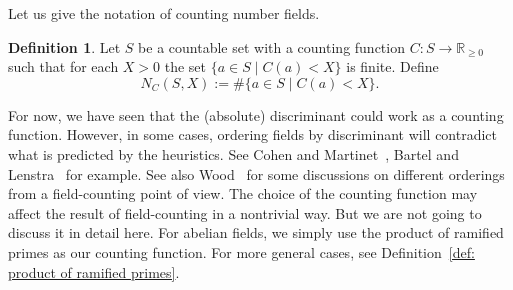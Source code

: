 \documentclass{amsart}
\numberwithin{equation}{section}
\theoremstyle{plain}
\theoremstyle{definition}
\newtheorem{definition}[theorem]{Definition}
\theoremstyle{remark}
\begin{document}
Let us give the notation of counting number fields.
\begin{definition}\label{def:counting number fields}
    Let $S$ be a countable set with a counting function $C:S\to\mathbb{R}_{\geq0}$ such that for each $X>0$ the set $\{a\in S\mid C(a)<X\}$ is finite.
    Define
	\begin{equation*}
		N_{C}(S,X):=\#\{a\in S\mid C(a)<X\}.
	\end{equation*}
\end{definition}
For now, we have seen that the (absolute) discriminant could work as a counting function.
However, in some cases, ordering fields by discriminant will contradict what is predicted by the heuristics.
See Cohen and Martinet~\cite{Cohen1994HeuristicsOC}, Bartel and Lenstra~\cite{bartel2020class} for example.
See also Wood~\cite{wood2010probabilities} for some discussions on different orderings from a field-counting point of view.
The choice of the counting function may affect the result of field-counting in a nontrivial way.
But we are not going to discuss it in detail here.
For abelian fields, we simply use the product of ramified primes as our counting function.
For more general cases, see Definition~\ref{def: product of ramified primes}.
\end{document}
